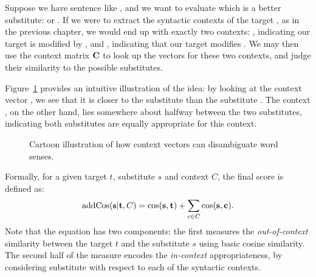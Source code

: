 Suppose we have sentence like , and we
want to evaluate which is a better substitute:  or .
If we were to extract the syntactic contexts of the target , as in
the previous chapter, we would end up with exactly two contexts:
, indicating our target is modified by , and
, indicating that our target modifies
. We may then use the context matrix ${{\mathbf{C}}}$ to look up the
vectors for these two contexts, and judge their similarity to the possible
substitutes.

Figure~\ref{fig:substitution} provides an intuitive illustration of the idea:
by looking at the context vector , we see that it is
closer to the substitute  than the substitute . The
context , on the other hand, lies somewhere about halfway
between the two substitutes, indicating both substitutes are equally appropriate
for this context.

\begin{figure}
\centering
{}
\caption{Cartoon illustration of how context vectors can disambiguate word senses.}
\label{fig:substitution}
\end{figure}

Formally, for a given target $t$, substitute $s$ and context $C$, the final
{\addCos} score is defined as:
\begin{equation}
  \text{addCos}({\mathbf{s}}|{\mathbf{t}},C) = \text{cos}({\mathbf{s}}, {\mathbf{t}}) + \sum_{c\in C} \text{cos}({\mathbf{s}}, {\mathbf{c}}).
\end{equation}
Note that the equation has two components: the first measures the {\em
out-of-context} similarity between the target $t$ and the substitute $s$ using
basic cosine similarity. The second half of the measure encodes the {\em
in-context} appropriateness, by considering substitute with respect to
each of the syntactic contexts.

